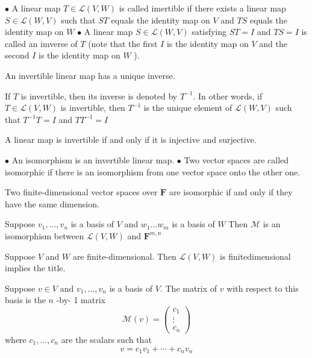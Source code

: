 $\bullet$ A linear map $T \in \mathcal{L}(V, W)$ is called imertible if there exists a linear map $S \in \mathcal{L}(W, V)$ such that $S T$ equals the identity map on
$V$ and $T S$ equals the identity map on $W$
$\bullet$ A linear map $S \in \mathcal{L}(W, V)$ satisfying $S T=I$ and $T S=I$ is called an imverse of $T$ (note that the first $I$ is the identity map on $V$ and the second $I$ is the identity map on $W$ ).

An invertible linear map has a unique inverse.

If $T$ is invertible, then its inverse is denoted by $T^{-1} .$ In other words, if $T \in \mathcal{L}(V, W)$ is invertible, then $T^{-1}$ is the unique element of $\mathcal{L}(W, V)$ such that $T^{-1} T=I$ and $T T^{-1}=I$

A linear map is invertible if and only if it is injective and surjective.

$\bullet$ An isomorphism is an invertible linear map.
$\bullet$ Two vector spaces are called isomorphic if there is an isomorphism from one vector space onto the other one.

Two finite-dimensional vector spaces over $\mathbf{F}$ are isomorphic if and only if they have the same dimension.

Suppose $v_{1}, \ldots, v_{n}$ is a basis of $V$ and $w_{1} \ldots w_{m}$ is a basis of $W$ Then $\mathcal{M}$ is an isomorphism between $\mathcal{L}(V, W)$ and $\mathbf{F}^{m, n}$

Suppose $V$ and $W$ are finite-dimensional. Then $\mathcal{L}(V, W)$ is finitedimensional implies the title.

Suppose $v \in V$ and $v_{1}, \ldots, v_{n}$ is a basis of $V .$ The matrix of $v$ with respect to this basis is the $n$ -by- 1 matrix
$$
\mathcal{M}(v)=\left(\begin{array}{c}
{c_{1}} \\
{\vdots} \\
{c_{n}}
\end{array}\right)
$$
where $c_{1}, \ldots, c_{n}$ are the scalars such that
$$
v=c_{1} v_{1}+\cdots+c_{n} v_{n}
$$

